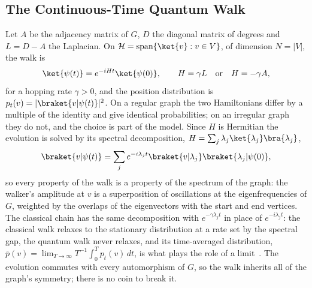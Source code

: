 \subsection{The Continuous-Time Quantum Walk}
\label{sec:ctqw}
Let $A$ be the adjacency matrix of $G$, $D$ the diagonal matrix of degrees
and $L = D - A$ the Laplacian. On $\mathcal{H} = \operatorname{span}\{\ket{v}
: v \in V\}$, of dimension $N = |V|$, the walk is
\begin{equation}
	\ket{\psi(t)} = e^{-iHt} \ket{\psi(0)}, \qquad H = \gamma L \quad \text{or} \quad H = -\gamma A,
	\label{eq:ctqw}
\end{equation}
for a hopping rate $\gamma > 0$, and the position distribution is $p_t(v) =
|\braket{v|\psi(t)}|^2$. On a regular graph the two Hamiltonians differ by a
multiple of the identity and give identical probabilities; on an irregular
graph they do not, and the choice is part of the model. Since $H$ is
Hermitian the evolution is solved by its spectral decomposition, $H =
\sum_j \lambda_j \ket{\lambda_j}\bra{\lambda_j}$,
\begin{equation}
	\braket{v|\psi(t)} = \sum_j e^{-i\lambda_j t} \braket{v|\lambda_j}\braket{\lambda_j|\psi(0)},
	\label{eq:ctqw-spectral}
\end{equation}
so every property of the walk is a property of the spectrum of the graph:
the walker's amplitude at $v$ is a superposition of oscillations at the
eigenfrequencies of $G$, weighted by the overlaps of the eigenvectors with
the start and end vertices. The classical chain has the same
decomposition with $e^{-\gamma\lambda_j t}$ in place of $e^{-i\lambda_j t}$:
the classical walk relaxes to the stationary distribution at a rate set by
the spectral gap, the quantum walk never relaxes, and its time-averaged
distribution, $\bar{p}(v) = \lim_{T\to\infty} T^{-1}\int_0^T p_t(v)\,dt$, is
what plays the role of a limit~\cite{Aharonov_2000}. The evolution commutes
with every automorphism of $G$, so the walk inherits all of the graph's
symmetry; there is no coin to break it.

